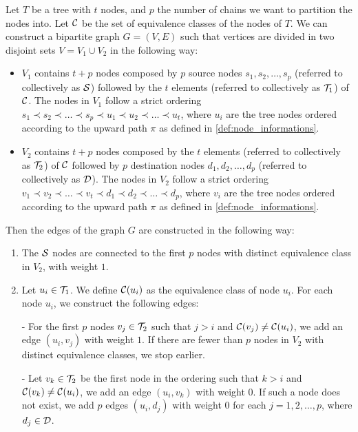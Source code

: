 \begin{definition} \label{def:bip_construction}
    Let $T$ be a tree with $t$ nodes, and $p$ the number of chains we want to partition the nodes into. Let $\mathcal{C}$ be the set of equivalence classes of the nodes of $T$. We can construct a bipartite graph $G = (V, E)$ such that vertices are divided in two disjoint sets $V = V_1 \cup V_2$ in the following way:
    \begin{itemize}[leftmargin=25pt]
        \item $V_1$ contains $t + p$ nodes composed by $p$ source nodes $s_1, s_2, \dots, s_p$ (referred to collectively as $\mathcal{S}$) followed by the $t$ elements (referred to collectively as $\mathcal{T}_{1}$) of $\mathcal{C}$. The nodes in $V_1$ follow a strict ordering $s_1 \prec s_2 \prec \dots \prec s_p \prec u_1 \prec u_2 \prec \dots \prec u_t$, where $u_i$ are the tree nodes ordered according to the upward path $\pi$ as defined in \cref{def:node_informations}.
        \item $V_2$ contains $t + p$ nodes composed by the $t$ elements (referred to collectively as $\mathcal{T}_{2}$) of $\mathcal{C}$ followed by $p$ destination nodes $d_1, d_2, \dots, d_p$ (referred to collectively as $\mathcal{D}$). The nodes in $V_2$ follow a strict ordering $v_1 \prec v_2 \prec \dots \prec v_t \prec d_1 \prec d_2 \prec \dots \prec d_p$, where $v_i$ are the tree nodes ordered according to the upward path $\pi$ as defined in \cref{def:node_informations}.
    \end{itemize}

    Then the edges of the graph $G$ are constructed in the following way:
    \begin{enumerate}[leftmargin=25pt]
        \item The $\mathcal{S}$ nodes are connected to the first $p$ nodes with distinct equivalence class in $V_2$, with weight $1$.
        \item Let $u_i \in \mathcal{T}_{1}$. We define $\mathcal{C}(u_i)$ as the equivalence class of node $u_i$. For each node $u_i$, we construct the following edges:
        
        - For the first $p$ nodes $v_j \in \mathcal{T}_{2}$ such that $j > i$ and $\mathcal{C}(v_j) \neq \mathcal{C}(u_i)$, we add an edge $(u_i, v_j)$ with weight $1$. If there are fewer than $p$ nodes in $V_2$ with distinct equivalence classes, we stop earlier.

        - Let $v_k \in \mathcal{T}_{2}$ be the first node in the ordering such that $k > i$ and $\mathcal{C}(v_k) \neq \mathcal{C}(u_i)$, we add an edge $(u_i, v_k)$ with weight $0$. If such a node does not exist, we add $p$ edges $(u_i, d_j)$ with weight $0$ for each $j = 1, 2, \ldots, p$, where $d_j \in \mathcal{D}$.
    \end{enumerate}
\end{definition}

